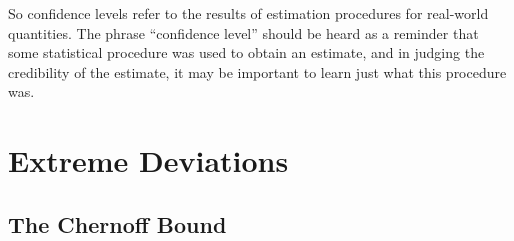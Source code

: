 So confidence levels refer to the results of estimation procedures for
real-world quantities.  The phrase ``confidence level'' should be heard as
a reminder that some statistical procedure was used to obtain an estimate,
and in judging the credibility of the estimate, it may be important to
learn just what this procedure was.


\section{Extreme Deviations}

\subsection{The Chernoff Bound}



\endinput
